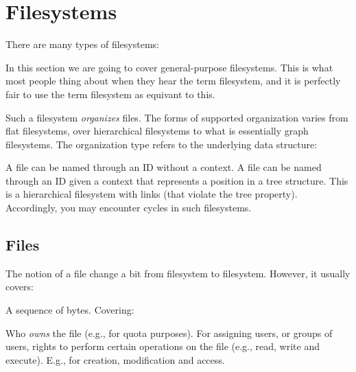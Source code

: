 

\section{Filesystems}

There are many types of filesystems:
\begin{itemize}
\end{itemize}

In this section we are going to cover general-purpose filesystems. This is what most people thing about when they hear the term filesystem, and it is perfectly fair to use the term filesystem as equivant to this.

Such a filesystem \textsl{organizes} files. The forms of supported organization varies from flat filesystems, over hierarchical filesystems to what is essentially graph filesystems. The organization type refers to the underlying data structure:
\begin{itemize}
   A file can be named through an ID without a context.
   A file can be named through an ID given a context that represents a position in a tree structure.
   This is a hierarchical filesystem with links (that violate the tree property). Accordingly, you may encounter cycles in such filesystems.
\end{itemize}

\subsection{Files}

The notion of a file change a bit from filesystem to filesystem. However, it usually covers:
\begin{itemize}
   A sequence of bytes.
    Covering:
    \begin{itemize}
        Who \textsl{owns} the file (e.g., for quota purposes).
        For assigning users, or groups of users, rights to perform certain operations on the file (e.g., read, write and execute).
        E.g., for creation, modification and access.
    \end{itemize}
\end{itemize}

